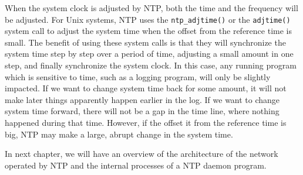 When the system clock is adjusted by NTP\null, both the time and the frequency
will be adjusted. For Unix systems, NTP uses the \verb|ntp_adjtime()| or
the \verb|adjtime()| system call to adjust the system time when the offset from
the reference time is small.
The benefit of using these system calls is that they will synchronize the system time step by
step over a period of time, adjusting a small amount in one step, and finally
synchronize the system clock. In this case, any running program which is sensitive to
time, such as a logging program, will only be slightly impacted. If we want to
change system time back for some amount, it will not make later things
apparently happen earlier in the log. If we want to change system time forward,
there will not be a gap in the time line, where nothing happened during that
time. However, if the offset it from the reference time is big, NTP may make a
large, abrupt change in the system time.

In next chapter, we will have an overview of the architecture of the network
operated by NTP and the internal processes of a NTP daemon program.




